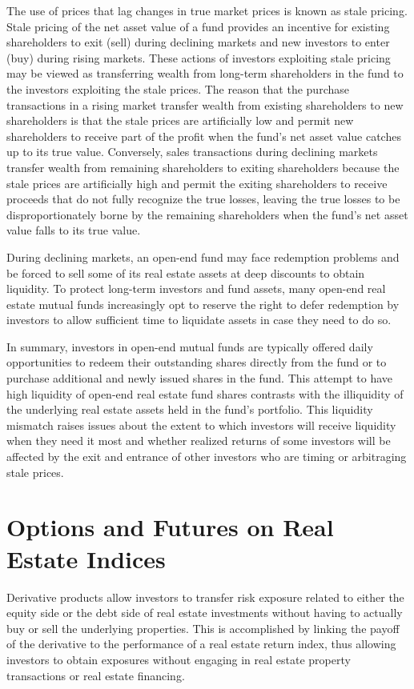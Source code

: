 \documentclass[11pt]{article}
\begin{document}
The use of prices that lag changes in true market prices is known as stale pricing. Stale pricing of the net asset value of a fund provides an incentive for existing shareholders to exit (sell) during declining markets and new investors to enter (buy) during rising markets. These actions of investors exploiting stale pricing may be viewed as transferring wealth from long-term shareholders in the fund to the investors exploiting the stale prices. The reason that the purchase transactions in a rising market transfer wealth from existing shareholders to new shareholders is that the stale prices are artificially low and permit new shareholders to receive part of the profit when the fund's net asset value catches up to its true value. Conversely, sales transactions during declining markets transfer wealth from remaining shareholders to exiting shareholders because the stale prices are artificially high and permit the exiting shareholders to receive proceeds that do not fully recognize the true losses, leaving the true losses to be disproportionately borne by the remaining shareholders when the fund's net asset value falls to its true value.

During declining markets, an open-end fund may face redemption problems and be forced to sell some of its real estate assets at deep discounts to obtain liquidity. To protect long-term investors and fund assets, many open-end real estate mutual funds increasingly opt to reserve the right to defer redemption by investors to allow sufficient time to liquidate assets in case they need to do so.

In summary, investors in open-end mutual funds are typically offered daily opportunities to redeem their outstanding shares directly from the fund or to purchase additional and newly issued shares in the fund. This attempt to have high liquidity of open-end real estate fund shares contrasts with the illiquidity of the underlying real estate assets held in the fund's portfolio. This liquidity mismatch raises issues about the extent to which investors will receive liquidity when they need it most and whether realized returns of some investors will be affected by the exit and entrance of other investors who are timing or arbitraging stale prices.

\section*{Options and Futures on Real Estate Indices}
Derivative products allow investors to transfer risk exposure related to either the equity side or the debt side of real estate investments without having to actually buy or sell the underlying properties. This is accomplished by linking the payoff of the derivative to the performance of a real estate return index, thus allowing investors to obtain exposures without engaging in real estate property transactions or real estate financing.
\end{document}
